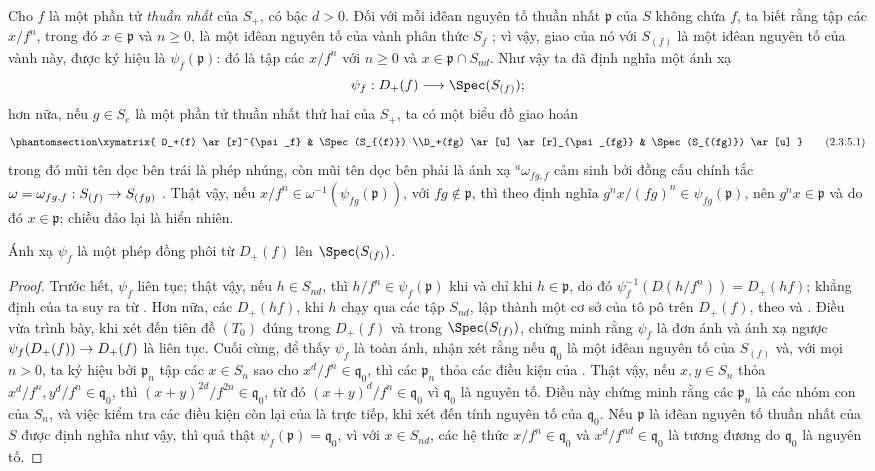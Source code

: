\documentclass[oneside,10pt]{amsart}
\makeatletter
\renewcommand{\geq}{\geqslant}
\newcommand{\ega@arrow}[2]{\mathchoice{#1}{#2}{#2}{#2}}
\renewcommand{\to}{\ega@arrow{\longrightarrow}{\rightarrow}}
\newcommand{\oldpage}[2][]{\marginnote{\normalfont\footnotesize\textbf{#1}~|~#2}\ignorespaces}
\let\EGAOriginalLabel\label
\renewcommand{\label}[1]{\phantomsection\EGAOriginalLabel{#1}}
\makeatother
\begin{document}
\begin{env}[2.3.5]
\label{II.2.3.5}
Cho $f$ là một phần tử \emph{thuần nhất} của $S_+$, có bậc $d>0$.
Đối với mỗi iđêan nguyên tố thuần nhất $\mathfrak{p}$ của $S$ không chứa $f$, ta biết rằng tập các $x/f^n$, trong đó $x\in\mathfrak{p}$ và $n\geq0$, là một iđêan nguyên tố của vành phân thức $S_f$ ; vì vậy, giao của nó với $S_{(f)}$ là một iđêan nguyên tố của vành này, được ký hiệu là $\psi_f(\mathfrak{p})$: đó là tập các $x/f^n$ với $n\geq0$ và $x\in\mathfrak{p}\cap S_{nd}$.
Như vậy ta đã định nghĩa một ánh xạ
\[
  \psi_f:D_+(f)\to\Spec(S_{(f)});
\]
hơn nữa, nếu $g\in S_e$ là một phần tử thuần nhất thứ hai của $S_+$, ta có một biểu đồ giao hoán
\[
\label{II.2.3.5.1}
  \xymatrix{
    D_+(f) \ar[r]^{\psi_f}
    & \Spec(S_{(f)})
  \\D_+(fg) \ar[u] \ar[r]_{\psi_{fg}}
    & \Spec(S_{(fg)}) \ar[u]
  }
\tag{2.3.5.1}
\]
trong đó mũi tên dọc bên trái là phép nhúng, còn mũi tên dọc bên phải là ánh xạ ${}^a\!\omega_{fg,f}$ cảm sinh bởi đồng cấu chính tắc $\omega=\omega_{fg,f}:S_{(f)}\to S_{(fg)}$ .
Thật vậy, nếu $x/f^n\in\omega^{-1}(\psi_{fg}(\mathfrak{p}))$, với $fg\notin\mathfrak{p}$, thì theo định nghĩa $g^nx/(fg)^n\in\psi_{fg}(\mathfrak{p})$, nên $g^nx\in\mathfrak{p}$ và do đó $x\in\mathfrak{p}$; chiều đảo lại là hiển nhiên.
\end{env}

\begin{proposition}[2.3.6]
\label{II.2.3.6}
Ánh xạ $\psi_f$ là một phép đồng phôi từ $D_+(f)$ lên $\Spec(S_{(f)})$.
\end{proposition}

\begin{proof}
Trước hết, $\psi_f$ liên tục; thật vậy, nếu $h\in S_{nd}$, thì $h/f^n\in\psi_f(\mathfrak{p})$ khi và chỉ khi $h\in\mathfrak{p}$, do đó $\psi_f^{-1}(D(h/f^n))=D_+(hf)$; khẳng định của ta suy ra từ .
Hơn nữa, các $D_+(hf)$, khi $h$ chạy qua các tập $S_{nd}$, lập thành một cơ sở của tô pô trên $D_+(f)$, theo  và .
Điều
\oldpage[II]{27}
vừa trình bày, khi xét đến tiên đề $(T_0)$ đúng trong $D_+(f)$ và trong $\Spec(S_{(f)})$, chứng minh rằng $\psi_f$ là đơn ánh và ánh xạ ngược $\psi_f(D_+(f))\to D_+(f)$ là liên tục.
Cuối cùng, để thấy $\psi_f$ là toàn ánh, nhận xét rằng nếu $\mathfrak{q}_0$ là một iđêan nguyên tố của $S_{(f)}$ và, với mọi $n>0$, ta ký hiệu bởi $\mathfrak{p}_n$ tập các $x\in S_n$ sao cho $x^d/f^n\in\mathfrak{q}_0$, thì các $\mathfrak{p}_n$ thỏa các điều kiện của .
Thật vậy, nếu $x,y\in S_n$ thỏa $x^d/f^n,y^d/f^n\in\mathfrak{q}_0$, thì $(x+y)^{2d}/f^{2n}\in\mathfrak{q}_0$, từ đó $(x+y)^d/f^n\in\mathfrak{q}_0$ vì $\mathfrak{q}_0$ là nguyên tố.
Điều này chứng minh rằng các $\mathfrak{p}_n$ là các nhóm con của $S_n$, và việc kiểm tra các điều kiện còn lại của  là trực tiếp, khi xét đến tính nguyên tố của $\mathfrak{q}_0$.
Nếu $\mathfrak{p}$ là iđêan nguyên tố thuần nhất của $S$ được định nghĩa như vậy, thì quả thật $\psi_f(\mathfrak{p})=\mathfrak{q}_0$, vì với $x\in S_{nd}$, các hệ thức $x/f^n\in\mathfrak{q}_0$ và $x^d/f^{nd}\in\mathfrak{q}_0$ là tương đương do $\mathfrak{q}_0$ là nguyên tố.
\end{proof}
\end{document}
